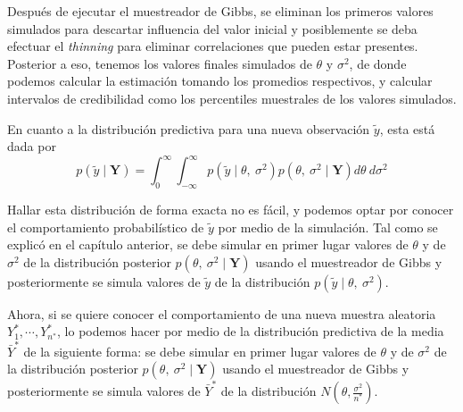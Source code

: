 \documentclass[10pt,openright]{book}\usepackage[]{graphicx}\usepackage[]{color}
\begin{document}
Despu\'es de ejecutar el muestreador de Gibbs, se eliminan los primeros valores simulados para descartar influencia del valor inicial y posiblemente se deba efectuar el \emph{thinning} para eliminar correlaciones que pueden estar presentes. Posterior a eso, tenemos los valores finales simulados de $\theta$ y $\sigma^2$, de donde podemos calcular la estimaci\'on tomando los promedios respectivos, y calcular intervalos de credibilidad como los percentiles muestrales de los valores simulados. 

En cuanto a la distribuci\'on predictiva para una nueva observaci\'on $\tilde{y}$, esta est\'a dada por
\begin{equation*}
p(\tilde{y}\mid\mathbf{Y})=\int_0^\infty\int_{-\infty}^\infty p(\tilde{y}\mid\theta,\ \sigma^2)p(\theta,\ \sigma^2\mid\mathbf{Y})d\theta\ d\sigma^2
\end{equation*}

Hallar esta distribuci\'on de forma exacta no es f\'acil, y podemos optar por conocer el comportamiento probabil\'istico de $\tilde{y}$ por medio de la simulaci\'on. Tal como se explic\'o en el cap\'itulo anterior, se debe simular en primer lugar valores de $\theta$ y de $\sigma^2$ de la distribuci\'on posterior $p(\theta,\ \sigma^2\mid\mathbf{Y})$ usando el muestreador de Gibbs y posteriormente se simula valores de $\tilde{y}$ de la distribuci\'on $p(\tilde{y}\mid\theta,\ \sigma^2)$. 

Ahora, si se quiere conocer el comportamiento de una nueva muestra aleatoria $Y_1^{*},\cdots,Y_{n^*}^{*}$, lo podemos hacer por medio de la distribuci\'on predictiva de la media $\bar{Y}^*$ de la siguiente forma: se debe simular en primer lugar valores de $\theta$ y de $\sigma^2$ de la distribuci\'on posterior $p(\theta,\ \sigma^2\mid\mathbf{Y})$ usando el muestreador de Gibbs y posteriormente se simula valores de $\bar{Y}^*$ de la distribuci\'on $N(\theta,\frac{\sigma^2}{n^*})$.
\end{document}
